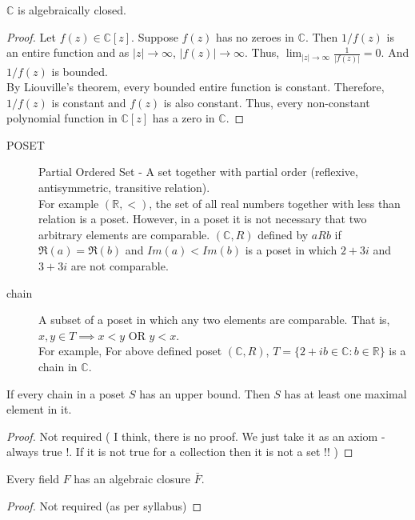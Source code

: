 \begin{theorem}
	$\mathbb{C}$ is algebraically closed.
\end{theorem}
\begin{proof}
	Let $f(z) \in \mathbb{C}[z]$.
	Suppose $f(z)$ has no zeroes in $\mathbb{C}$.
	Then $1/f(z)$ is an entire function and as $|z| \to \infty$, $|f(z)| \to \infty$.
	Thus, $\lim_{|z|\to\infty} \frac{1}{|f(z)|} = 0$.
	And $1/f(z)$ is bounded.\\
	
	By Liouville's theorem, every bounded entire function is constant.
	Therefore, $1/f(z)$ is constant and $f(z)$ is also constant.
	Thus, every non-constant polynomial function in $\mathbb{C}[z]$ has a zero in $\mathbb{C}$.
\end{proof}

\begin{description}
	\item[POSET] Partial Ordered Set - A set together with partial order (reflexive, antisymmetric, transitive relation).\\
		

	For example $(\mathbb{R},<)$, the set of all real numbers together with less than relation is a poset.
		However, in a poset it is not necessary that two arbitrary elements are comparable.
		$(\mathbb{C},R)$ defined by $aRb$ if $\Re(a) = \Re(b)$ and $Im(a) < Im(b)$ is a poset in which $2+3i$ and $3+3i$ are not comparable.
	\item[chain] A subset of a poset in which any two elements are comparable.
		That is, $x,y \in T \implies x < y \text{ OR } y < x$.\\

	For example, For above defined poset $(\mathbb{C},R)$, $T = \{ 2+ib \in \mathbb{C} : b \in \mathbb{R} \}$ is a chain in $\mathbb{C}$.
\end{description}
\begin{lemma}[Zorn]
	If every chain in a poset $S$ has an upper bound.
	Then $S$ has at least one maximal element in it.
\end{lemma}
\begin{proof}
	Not required ( I think, there is no proof.
	We just take it as an axiom - always true !.
	If it is not true for a collection then it is not a set !! )
\end{proof}
\begin{theorem}
	Every field $F$ has an algebraic closure $\bar{F}$.
\end{theorem}
\begin{proof}
	Not required (as per syllabus)
\end{proof}
